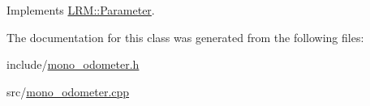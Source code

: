 \-Implements \hyperlink{classLRM_1_1Parameter_ad53ef22f20e18578caa644866aaa234b}{\-L\-R\-M\-::\-Parameter}.



\-The documentation for this class was generated from the following files\-:\begin{DoxyCompactItemize}
\item 
include/\hyperlink{mono__odometer_8h}{mono\-\_\-odometer.\-h}\item 
src/\hyperlink{mono__odometer_8cpp}{mono\-\_\-odometer.\-cpp}\end{DoxyCompactItemize}
